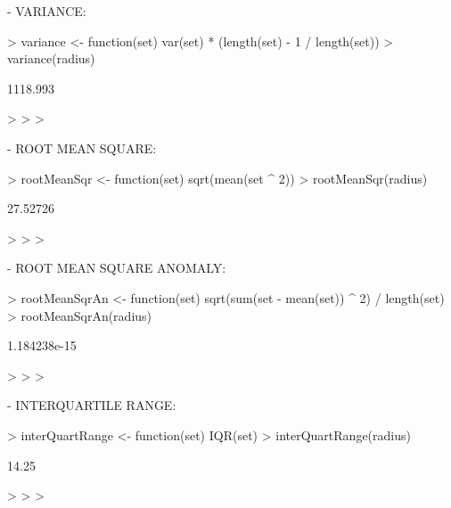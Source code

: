 \documentclass[a4paper]{article}
\begin{document}
- VARIANCE:



\begin{Schunk}
\begin{Sinput}
> variance <- function(set) {var(set) * (length(set) - 1 / length(set))}
> variance(radius)
\end{Sinput}
\begin{Soutput}
[1] 1118.993
\end{Soutput}
\begin{Sinput}
> 
> 
> 
\end{Sinput}
\end{Schunk}



- ROOT MEAN SQUARE:



\begin{Schunk}
\begin{Sinput}
> rootMeanSqr <- function(set) {sqrt(mean(set ^ 2))}
> rootMeanSqr(radius)
\end{Sinput}
\begin{Soutput}
[1] 27.52726
\end{Soutput}
\begin{Sinput}
> 
> 
> 
\end{Sinput}
\end{Schunk}



- ROOT MEAN SQUARE ANOMALY:



\begin{Schunk}
\begin{Sinput}
> rootMeanSqrAn <- function(set) {sqrt(sum(set - mean(set)) ^ 2) / length(set)}
> rootMeanSqrAn(radius)
\end{Sinput}
\begin{Soutput}
[1] 1.184238e-15
\end{Soutput}
\begin{Sinput}
> 
> 
> 
\end{Sinput}
\end{Schunk}



- INTERQUARTILE RANGE:



\begin{Schunk}
\begin{Sinput}
> interQuartRange <- function(set) {IQR(set)}
> interQuartRange(radius)
\end{Sinput}
\begin{Soutput}
[1] 14.25
\end{Soutput}
\begin{Sinput}
> 
> 
> 
\end{Sinput}
\end{Schunk}
\end{document}
